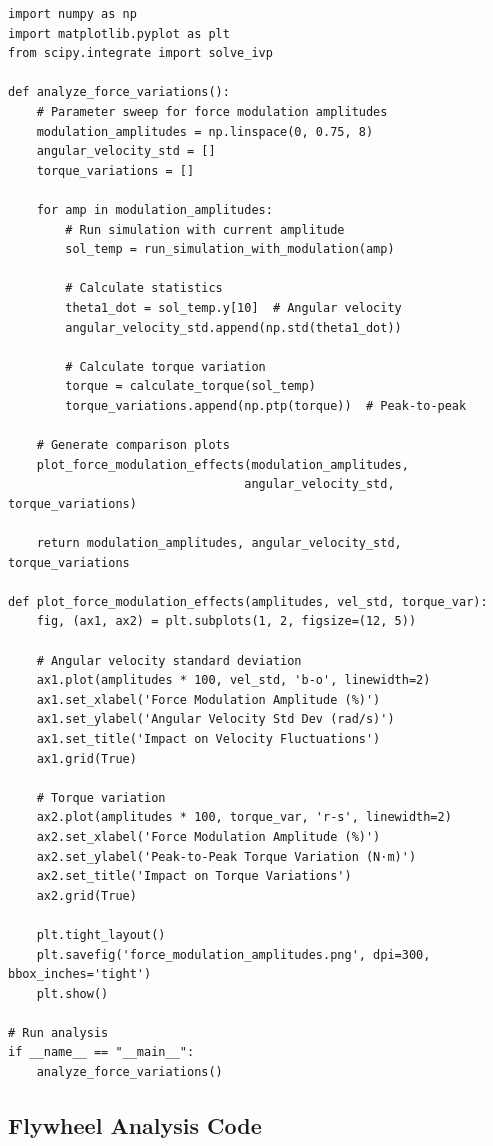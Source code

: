 \documentclass[10pt]{article}
\begin{document}
\begin{verbatim}
import numpy as np
import matplotlib.pyplot as plt
from scipy.integrate import solve_ivp

def analyze_force_variations():
    # Parameter sweep for force modulation amplitudes
    modulation_amplitudes = np.linspace(0, 0.75, 8)
    angular_velocity_std = []
    torque_variations = []
    
    for amp in modulation_amplitudes:
        # Run simulation with current amplitude
        sol_temp = run_simulation_with_modulation(amp)
        
        # Calculate statistics
        theta1_dot = sol_temp.y[10]  # Angular velocity
        angular_velocity_std.append(np.std(theta1_dot))
        
        # Calculate torque variation
        torque = calculate_torque(sol_temp)
        torque_variations.append(np.ptp(torque))  # Peak-to-peak
    
    # Generate comparison plots
    plot_force_modulation_effects(modulation_amplitudes, 
                                 angular_velocity_std, torque_variations)
    
    return modulation_amplitudes, angular_velocity_std, torque_variations

def plot_force_modulation_effects(amplitudes, vel_std, torque_var):
    fig, (ax1, ax2) = plt.subplots(1, 2, figsize=(12, 5))
    
    # Angular velocity standard deviation
    ax1.plot(amplitudes * 100, vel_std, 'b-o', linewidth=2)
    ax1.set_xlabel('Force Modulation Amplitude (%)')
    ax1.set_ylabel('Angular Velocity Std Dev (rad/s)')
    ax1.set_title('Impact on Velocity Fluctuations')
    ax1.grid(True)
    
    # Torque variation
    ax2.plot(amplitudes * 100, torque_var, 'r-s', linewidth=2)
    ax2.set_xlabel('Force Modulation Amplitude (%)')
    ax2.set_ylabel('Peak-to-Peak Torque Variation (N⋅m)')
    ax2.set_title('Impact on Torque Variations')
    ax2.grid(True)
    
    plt.tight_layout()
    plt.savefig('force_modulation_amplitudes.png', dpi=300, bbox_inches='tight')
    plt.show()

# Run analysis
if __name__ == "__main__":
    analyze_force_variations()
\end{verbatim}

\subsection{Flywheel Analysis Code}
\end{document}
